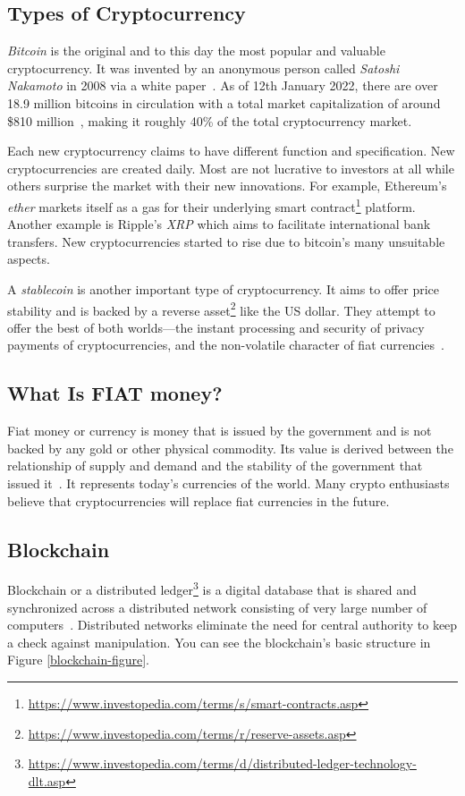 \subsection*{Types of Cryptocurrency}
\emph{Bitcoin} is the original and to this day the most popular and valuable cryptocurrency. It was invented by an anonymous person called \emph{Satoshi Nakamoto} in 2008 via a white paper~\cite{satoshi}. As of 12th January 2022, there are over 18.9 million bitcoins in circulation with a total market capitalization of around \$810 million~\cite{coinmarketcap}, making it roughly 40\% of the total cryptocurrency market.

Each new cryptocurrency claims to have different function and specification. New cryptocurrencies are created daily. Most are not lucrative to investors at all while others surprise the market with their new innovations. For example, Ethereum's \emph{ether} markets itself as a gas for their underlying smart contract\footnote{\url{https://www.investopedia.com/terms/s/smart-contracts.asp}} platform. Another example is Ripple's \emph{XRP} which aims to facilitate international bank transfers. New cryptocurrencies started to rise due to bitcoin's many unsuitable aspects.

\label{stablecoins-ref}
A \emph{stablecoin} is another important type of cryptocurrency. It aims to offer price stability and is backed by a reverse asset\footnote{\url{https://www.investopedia.com/terms/r/reserve-assets.asp}} like the US dollar. They attempt to offer the best of both worlds---the instant processing and security of privacy payments of cryptocurrencies, and the non-volatile character of fiat currencies~\cite{investopedia-stablecoin}.

\subsection*{What Is FIAT money?}
﻿Fiat money or currency is money that is issued by the government and is not backed by any gold or other physical commodity. Its value is derived between the relationship of supply and demand and the stability of the government that issued it~\cite{investopedia-fiat}. It represents today's currencies of the world. Many crypto enthusiasts believe that cryptocurrencies will replace fiat currencies in the future.

\subsection*{Blockchain}
\label{blockchain}
Blockchain or a distributed ledger\footnote{\url{https://www.investopedia.com/terms/d/distributed-ledger-technology-dlt.asp}} is a digital database that is shared and synchronized across a distributed network consisting of very large number of computers~\cite{investopedia-blockchain}. Distributed networks eliminate the need for central authority to keep a check against manipulation. You can see the blockchain's basic structure in Figure \ref{blockchain-figure}.

